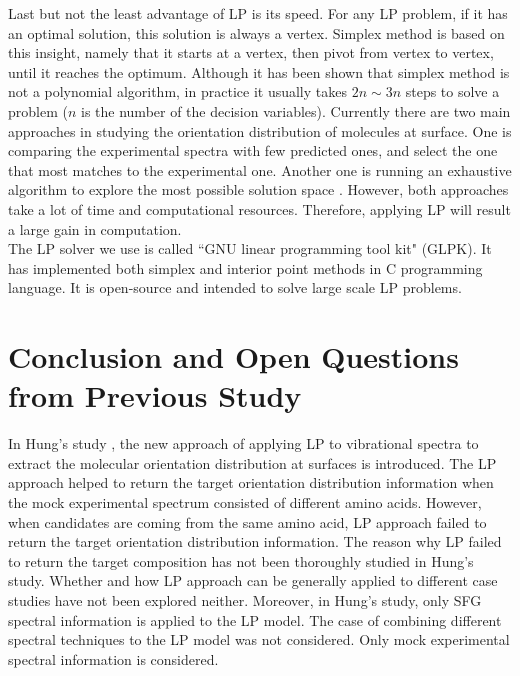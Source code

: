 Last but not the least advantage of LP is its speed. For any LP problem, if it has an optimal solution, this solution is always a vertex. Simplex method is based on this insight, namely that it starts at a vertex, then pivot from vertex to vertex, until it reaches the optimum. Although it has been shown that simplex method is not a polynomial algorithm, in practice it usually takes $2n\sim3n$ steps to solve a problem ($n$ is the number of the decision variables). Currently there are two main approaches in studying the orientation distribution of molecules at surface. One is comparing the experimental spectra with few predicted ones, and select the one that most matches to the experimental one. Another one is running an exhaustive algorithm to explore the most possible solution space \cite{hore0033-rotations}. However, both approaches take a lot of time and computational resources. Therefore, applying LP will result a large gain in computation.\\

The LP solver we use is called ``GNU linear programming tool kit" (GLPK). It has implemented both simplex and interior point methods in C programming language. It is open-source and intended to solve large scale LP problems. \\

\section{Conclusion and Open Questions from Previous Study}
In Hung's study \cite{KuoKaiHung:Thesis:2015}, the new approach of applying LP to vibrational spectra to extract the molecular orientation distribution at surfaces is introduced. The LP approach helped to return the target orientation distribution information when the mock experimental spectrum consisted of different amino acids. However, when candidates are coming from the same amino acid, LP approach failed to return the target orientation distribution information. The reason why LP failed to return the target composition has not been thoroughly studied in Hung's study. Whether and how LP approach can be generally applied to different case studies have not been explored neither. Moreover, in Hung's study, only SFG spectral information is applied to the LP model. The case of combining different spectral techniques to the LP model was not considered. Only mock experimental spectral information is considered.
	
